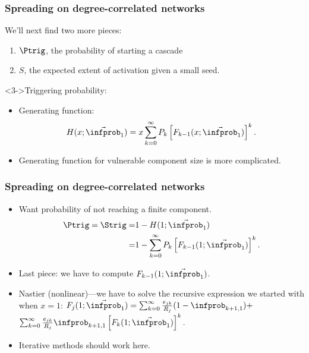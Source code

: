 \begin{frame}
  \frametitle{Spreading on degree-correlated networks}

  \begin{block}{We'll next find two more pieces:}
    \begin{enumerate}
    \item<1-> 
      $\Ptrig$, the probability of starting a cascade
    \item<2->
      $S$, the expected extent of activation given
      a small seed.
    \end{enumerate}

    \begin{block}<3->{Triggering probability:}
      \begin{itemize}
      \item 
        Generating function:
        $$
        H(x;\vec{\infprob}_1)
        = 
        x
        \sum_{k=0}^\infty
        P_k
        \left[
          F_{k-1}(x;\vec{\infprob}_1)
        \right]^k.
        $$
      \item<4->
        Generating function for vulnerable
        component size is more complicated.
      \end{itemize}
    \end{block}
    
  \end{block}

\end{frame}

\begin{frame}
  \frametitle{Spreading on degree-correlated networks}


  \begin{itemize}
  \item<1-> 
    Want probability of \alert{not reaching} a finite component.
    \begin{align}
      \nonumber
      \Ptrig  = \Strig 
      = & 
      1 -
      H(1;\vec{\infprob}_1) 
      \\
      \nonumber
      = &
      1
      -
      \sum_{k=0}^\infty
      P_k
      \left[
        F_{k-1}(1;\vec{\infprob}_1)
      \right]^k.
    \end{align}
  \item<2->
    Last piece: we have to compute $F_{k-1}(1;\vec{\infprob}_1)$.
  \item<3->
    Nastier (nonlinear)---we have to solve the 
    recursive expression we started with when $x=1$:
    $
      F_j(1;\vec{\infprob}_1)
      =
      \sum_{k=0}^{\infty} 
      \frac{e_{jk}}{R_j}
      ( 1 - \infprob_{k+1,1} )
      + $\\
      \mbox{} \hfill
      $
      \sum_{k=0}^{\infty} 
      \frac{e_{jk}}{R_j}
      \infprob_{k+1,1}
      \left[
        F_k(1;\vec{\infprob}_1)
      \right]^k.
    $
  \item<4->
    Iterative methods should work here.
  \end{itemize}

\end{frame}

